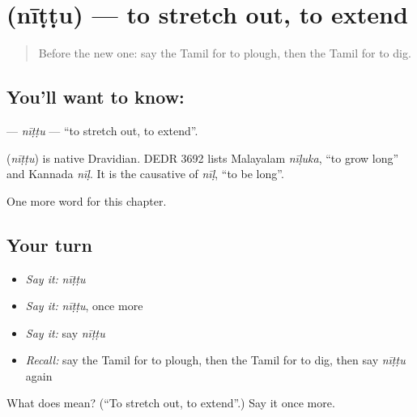 \section[\texorpdfstring{\ta{நீட்டு} (nīṭṭu)}{நீட்டு (nīṭṭu)}]{ (nīṭṭu) — to stretch out, to extend}

\label{lesson:TA-C168-nittu}



\begin{quote}
Before the new one: say the Tamil for to plough, then the Tamil for to dig.
\end{quote}

\subsection*{You'll want to know: }
\textbf{} — \emph{nīṭṭu} — \textquotedblleft{}to stretch out, to extend\textquotedblright{}.

\begin{cousinweb}
\textbf{} (\emph{nīṭṭu}) is native Dravidian. DEDR 3692 lists Malayalam \emph{nīḷuka}, \textquotedblleft{}to grow long\textquotedblright{} and Kannada \emph{nīḷ}. It is the causative of \emph{nīḷ}, \textquotedblleft{}to be long\textquotedblright{}.
\end{cousinweb}

\begin{grammarlens}[title={What you've built}]
One more word for this chapter.
\end{grammarlens}

\subsection*{Your turn}
\begin{itemize}
\raggedright
  \item \emph{Say it:} \emph{nīṭṭu}
  \item \emph{Say it:} \emph{nīṭṭu}, once more
  \item \emph{Say it:} say \emph{nīṭṭu}
  \item \emph{Recall:} say the Tamil for to plough, then the Tamil for to dig, then say \emph{nīṭṭu} again
\end{itemize}

\begin{tcolorbox}[breakable,colback=teal!4,colframe=teal!35!black,title={Before you move on}]
What does  mean? (\textquotedblleft{}To stretch out, to extend\textquotedblright{}.) Say it once more.
\end{tcolorbox}
